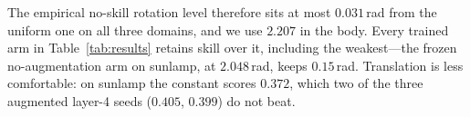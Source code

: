The empirical no-skill rotation level therefore sits at most $0.031$\,rad from the uniform
one on all three domains, and we use $2.207$ in the body. Every trained arm in
Table~\ref{tab:results} retains skill over it, including the weakest---the frozen
no-augmentation arm on sunlamp, at $2.048$\,rad, keeps $0.15$\,rad. Translation is less
comfortable: on sunlamp the constant scores $0.372$, which two of the three augmented
layer-4 seeds ($0.405$, $0.399$) do not beat.
